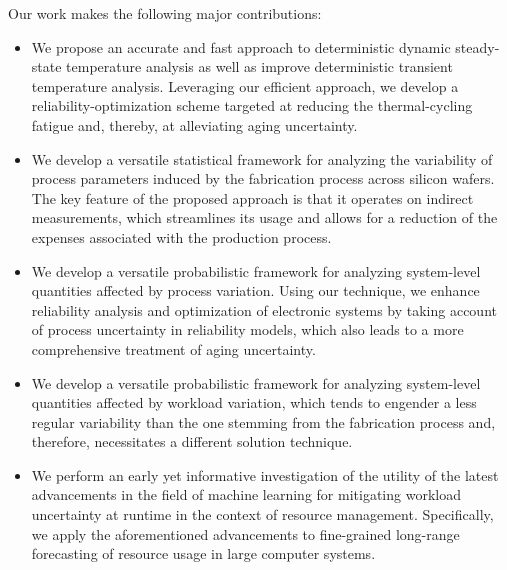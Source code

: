 Our work makes the following major contributions:

\begin{itemize}

\item
We propose an accurate and fast approach to deterministic dynamic steady-state
temperature analysis as well as improve deterministic transient temperature
analysis. Leveraging our efficient approach, we develop a
reliability-optimization scheme targeted at reducing the thermal-cycling fatigue
and, thereby, at alleviating aging uncertainty.

\item
We develop a versatile statistical framework for analyzing the variability of
process parameters induced by the fabrication process across silicon wafers. The
key feature of the proposed approach is that it operates on indirect
measurements, which streamlines its usage and allows for a reduction of the
expenses associated with the production process.

\item
We develop a versatile probabilistic framework for analyzing system-level
quantities affected by process variation. Using our technique, we enhance
reliability analysis and optimization of electronic systems by taking account of
process uncertainty in reliability models, which also leads to a more
comprehensive treatment of aging uncertainty.

\item
We develop a versatile probabilistic framework for analyzing system-level
quantities affected by workload variation, which tends to engender a less
regular variability than the one stemming from the fabrication process and,
therefore, necessitates a different solution technique.

\item
We perform an early yet informative investigation of the utility of the latest
advancements in the field of machine learning for mitigating workload
uncertainty at runtime in the context of resource management. Specifically, we
apply the aforementioned advancements to fine-grained long-range forecasting of
resource usage in large computer systems.

\end{itemize}
